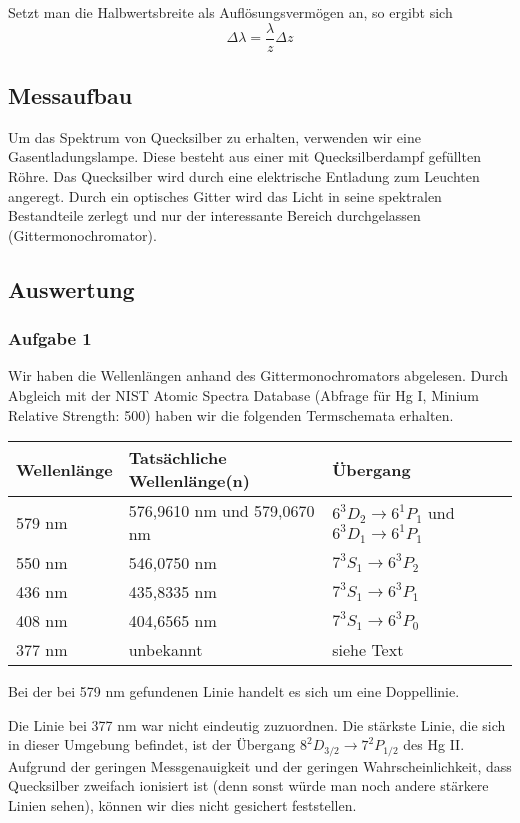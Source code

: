 \documentclass[a4paper,german,12pt,smallheadings]{scrartcl}
\begin{document}
Setzt man die Halbwertsbreite als Auflösungsvermögen an, so ergibt sich
\begin{equation}
  \Delta \lambda = \frac{\lambda}{z} \Delta z
  \label{eq:aufls}
\end{equation}

\subsection{Messaufbau}

Um das Spektrum von Quecksilber zu erhalten, verwenden wir eine Gasentladungslampe.
Diese besteht aus einer mit Quecksilberdampf gefüllten Röhre. Das Quecksilber wird
durch eine elektrische Entladung zum Leuchten angeregt. Durch ein optisches
Gitter wird das Licht in seine spektralen Bestandteile zerlegt und nur der
interessante Bereich durchgelassen (Gittermonochromator).

\subsection{Auswertung}

\subsubsection{Aufgabe 1}

Wir haben die Wellenlängen anhand des Gittermonochromators abgelesen. Durch
Abgleich mit der NIST Atomic Spectra Database (Abfrage für Hg I, Minium
Relative Strength: 500) haben wir die folgenden Termschemata erhalten.

\begin{tabular}{l|l|l}
  Wellenlänge & Tatsächliche Wellenlänge(n) & Übergang \\
  \hline
  579 nm & 576{,}9610 nm und 579{,}0670 nm & $6^3D_2 \to 6^1P_1$ und $6^3D_1 \to 6^1P_1$ \\
  550 nm & 546{,}0750 nm                   & $7^3S_1 \to 6^3P_2$ \\
  436 nm & 435{,}8335 nm                   & $7^3S_1 \to 6^3P_1$ \\
  408 nm & 404{,}6565 nm                   & $7^3S_1 \to 6^3P_0$ \\
  377 nm & unbekannt & siehe Text
\end{tabular}
\vspace{22pt}

Bei der bei 579 nm gefundenen Linie handelt es sich um eine Doppellinie.

Die Linie bei 377 nm war nicht eindeutig zuzuordnen. Die stärkste Linie, die
sich in dieser Umgebung befindet, ist der Übergang $8^2D_{3/2} \to 7^2P_{1/2}$
des Hg II. Aufgrund der geringen Messgenauigkeit und der geringen
Wahrscheinlichkeit, dass Quecksilber zweifach ionisiert ist (denn sonst würde
man noch andere stärkere Linien sehen), können wir dies nicht gesichert
feststellen.
\end{document}
